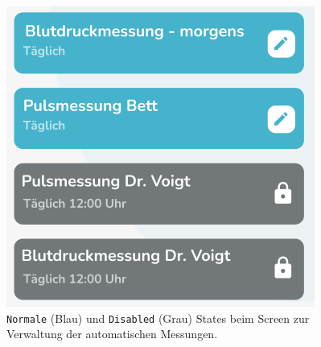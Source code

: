\begin{figure}[!h]
	\centering
	\includegraphics[width=0.4\linewidth]{images/states}
	\caption{\texttt{Normale} (Blau) und \texttt{Disabled} (Grau) States beim Screen zur Verwaltung der automatischen Messungen.}
	\label{fig:states}
\end{figure}

\newpage
